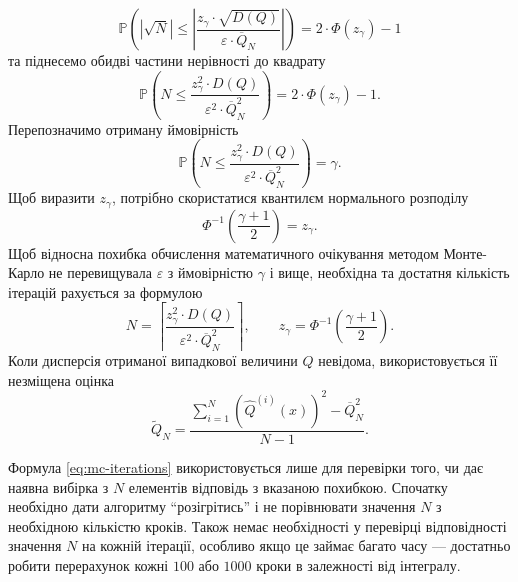 \begin{equation*}
  \mathbb{P}\left(
    \left|
      \sqrt{N}
    \right|
    \le \left|
      \frac{z_{\gamma} \cdot \sqrt{D\left( Q \right)}}
      {\varepsilon \cdot \overline{Q}_N} \right|
  \right)
  = 2 \cdot \Phi\left( z_{\gamma} \right) - 1
\end{equation*}
та піднесемо обидві частини нерівності до квадрату
\begin{equation*}
  \mathbb{P}\left(
    N
    \le \frac{z^2_{\gamma} \cdot D\left( Q \right)}
      {\varepsilon^2 \cdot \overline{Q}_N^2}
  \right)
  = 2 \cdot \Phi\left( z_{\gamma} \right) - 1.
\end{equation*}
Перепозначимо отриману ймовірність
\begin{equation*}
  \mathbb{P}\left(
    N
    \le \frac{z^2_{\gamma} \cdot D\left( Q \right)}
      {\varepsilon^2 \cdot \overline{Q}_N^2}
  \right)
  = \gamma.
\end{equation*}
Щоб виразити $z_{\gamma}$,
потрібно скористатися квантилєм нормального розподілу
\begin{equation*}
  \Phi^{-1}\left( \frac{\gamma + 1}{2} \right) = z_{\gamma}.
\end{equation*}
Щоб відносна похибка обчислення математичного очікування методом Монте-Карло
не перевищувала $\varepsilon$ з ймовірністю $\gamma$ і вище,
необхідна та достатня кількість ітерацій рахується за формулою
\begin{equation}\label{eq:mc-iterations}
    N
    = \left\lceil \frac{z^2_{\gamma} \cdot D\left( Q \right)}
      {\varepsilon^2 \cdot \overline{Q}_N^2} \right\rceil, \qquad
    z_{\gamma} = \Phi^{-1}\left( \frac{\gamma + 1}{2} \right).
\end{equation}
Коли дисперсія отриманої випадкової величини $Q$ невідома,
використовується її незміщена оцінка
\begin{equation*}
  \widetilde{Q}_N
  = \frac{
    \sum\limits_{i=1}^{N}
      \left( \hat{Q}^{\left( i \right)}\left( x \right) \right)^2
    - \overline{Q}_N^2}{N - 1}.
\end{equation*}

Формула \eqref{eq:mc-iterations} використовується лише для перевірки того,
чи дає наявна вибірка з $N$ елементів відповідь з вказаною похибкою.
Спочатку необхідно дати алгоритму ``розігрітись'' і не порівнювати значення $N$
з необхідною кількістю кроків.
Також немає необхідності у перевірці відповідності значення $N$
на кожній ітерації,
особливо якщо це займає багато часу ---
достатньо робити перерахунок кожні $100$ або $1000$ кроки в залежності від
інтегралу.
